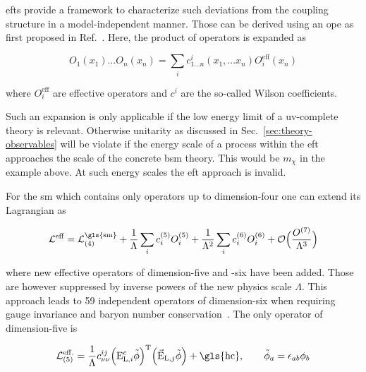 \Glspl{eft} provide a framework to characterize such deviations from the coupling structure in a model-independent manner. Those can be derived using an \gls{ope} as first proposed in Ref.~\cite{Wilson:1972ee}. Here, the product of operators is expanded as


\begin{equation}
{O}_{1}(x_{1})\ldots {O}_{n}(x_{n})=\sum_{i}c_{1\ldots n}^{i}(x_{1},\ldots x_{n}){O}_{i}^\mathrm{eff}(x_{n})
\end{equation}

where $O_{i}^\mathrm{eff}$ are effective operators and $c^{i}$ are the so-called Wilson coefficients.

Such an expansion is only applicable if the low energy limit of a \gls{uv}-complete theory is relevant. Otherwise unitarity as discussed in Sec.~\ref{sec:theory-observables} will be violate if the energy scale of a process within the \gls{eft} approaches the scale of the concrete \gls{bsm} theory. This would be $m_\chi$ in the example above. At such energy scales the \gls{eft} approach is invalid.

For the \gls{sm} which contains only operators up to dimension-four one can extend its Lagrangian as

\begin{equation}
\mathcal{L}^\mathrm{eff}=\mathcal{L}^\mathrm{\gls{sm}}_\mathrm{(4)}+\frac{1}{\Lambda}\sum_{i}c_{i}^\mathrm{(5)}{O}_{i}^\mathrm{(5)}+\frac{1}{\Lambda^{2}}\sum_{i}c_{i}^\mathrm{(6)}{O}_{i}^\mathrm{(6)}+\mathcal{O}\Big(\frac{O^\mathrm{(7)}}{\Lambda^3}\Big)
\end{equation}

where new effective operators of dimension-five and -six have been added. Those are however suppressed by inverse powers of the new physics scale $\Lambda$. This approach leads to 59 independent operators of dimension-six when requiring gauge invariance and baryon number conservation~\cite{Grzadkowski:2010es}. The only operator of dimension-five is

\begin{equation}
\mathcal{L}^\mathrm{eff.}_\mathrm{(5)}=\frac{1}{\Lambda}c^{ij}_{\nu\nu}\Big({\mathrm{E}}^{c}_{\mathrm{L},i}\tilde{\phi}\Big)^\mathrm{T}\Big(\vec{\mathrm{E}}_{\mathrm{L},j}\tilde{\phi}\Big)+\mathrm{\gls{hc}},\qquad \tilde{\phi}_{a}=\epsilon_{ab}\phi_{b}
\end{equation}

